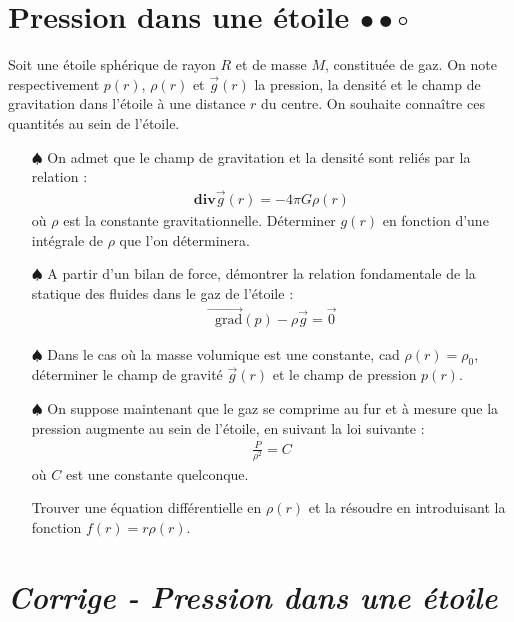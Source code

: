 \documentclass{report}
\newcommand*\grad{\mathop{}\!\mathrm{grad}}
\begin{document}
\newpage

\section*{Pression dans une étoile $\bullet\bullet\circ$}

Soit une étoile sphérique de rayon $R$ et de masse $M$, constituée de gaz. On note respectivement $p(r)$, $\rho(r)$ et $\vec{g}(r)$ la pression, la densité et le champ de gravitation dans l'étoile à une distance $r$ du centre. On souhaite connaître ces quantités au sein de l'étoile. 

\begin{itemize}

	\item[$\spadesuit$] On admet que le champ de gravitation et la densité sont reliés par la relation :
	\begin{align*}
		\mathbf{div}\vec{g}(r)=-4\pi G\rho(r)
	\end{align*}
où $\rho$ est la constante gravitationnelle. 
Déterminer $g(r)$ en fonction d'une intégrale de $\rho$ que l'on déterminera.

	\item[$\spadesuit$] A partir d'un bilan de force, démontrer la relation fondamentale de la statique des fluides dans le gaz de l'étoile : 
	\begin{align*}
		\vec{\grad}(p) - \rho\vec{g}=\vec{0}
	\end{align*}
	
	\item[$\spadesuit$] Dans le cas où la masse volumique est une constante, cad $\rho(r)=\rho_0$, déterminer le champ de gravité $\vec{g}(r)$ et le champ de pression $p(r)$.
	
	\item[$\spadesuit$] On suppose maintenant que le gaz se comprime au fur et à mesure que la pression augmente au sein de l'étoile, en suivant la loi suivante : 
	\begin{align*}
		\frac{P}{\rho^2}= C
	\end{align*}
	où $C$ est une constante quelconque. 
	
	Trouver une équation différentielle en $\rho(r)$ et la résoudre en introduisant la fonction $f(r)=r\rho(r)$.

\end{itemize}

\newpage

\section*{\textit{Corrige - Pression dans une étoile}}
\end{document}
